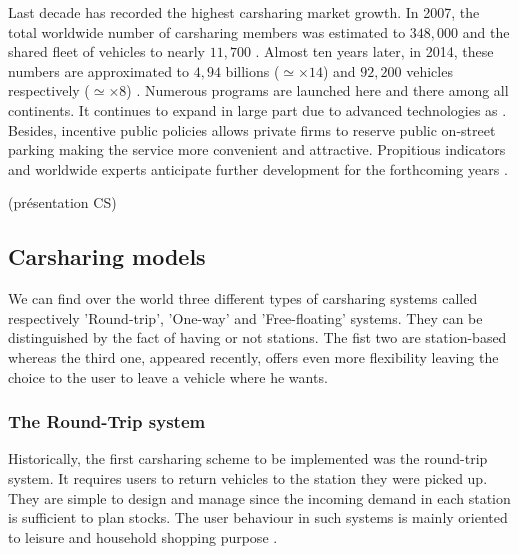 \begin{bibunit}[ieeetr]
\medskip
Last decade has recorded the highest carsharing market growth.
In 2007, the total worldwide number of carsharing members was estimated to $348,000$ and the shared fleet of vehicles to nearly $11,700$ \cite{shaheen_growth_2007}.
Almost ten years later, in 2014, these numbers are approximated to $4,94$ billions ($\simeq \times 14$) and $92,200$ vehicles respectively ($\simeq \times 8$) \cite{statista_carsharingNumbers}.
Numerous programs are launched here and there among all continents.
It continues to expand in large part due to advanced technologies as .
Besides, incentive public policies allows private firms to reserve public on-street parking making the service more convenient and attractive.
Propitious indicators and worldwide experts anticipate further development for the forthcoming years \cite{shaheen_carsharing_2013}.




\cite{louvet_enquete_2013} (présentation CS)



\subsection{Carsharing models}
We can find over the world three different types of carsharing systems called respectively 'Round-trip', 'One-way' and 'Free-floating' systems.
They can be distinguished by the fact of having or not stations.
The fist two are station-based whereas the third one, appeared recently, offers even more flexibility leaving the choice to the user to leave a vehicle where he wants.


\subsubsection{The Round-Trip system}
Historically, the first carsharing scheme to be implemented was the round-trip system.
It requires users to return vehicles to the station they were picked up.
They are simple to design and manage since the incoming demand in each station is sufficient to plan stocks.
The user behaviour in such systems is mainly oriented to leisure and household shopping purpose \cite{barth_shared_use_2002, costain_synopsis_2012}.



\end{bibunit}
